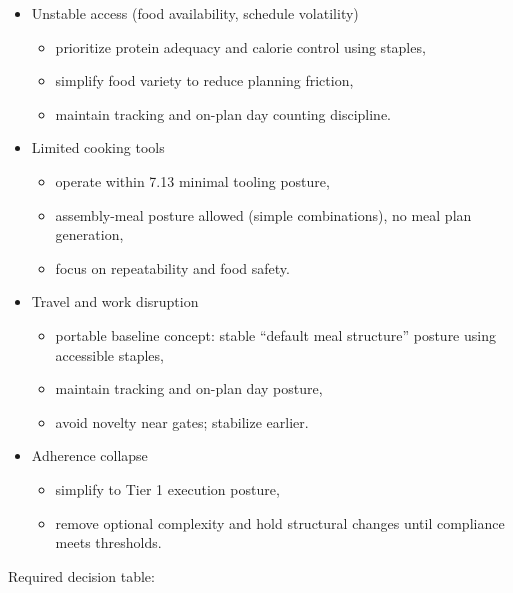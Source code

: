 \documentclass[10pt]{article}
\begin{document}
\begin{itemize}
\item Unstable access (food availability, schedule volatility)
\begin{itemize}
\item prioritize protein adequacy and calorie control using staples,
\item simplify food variety to reduce planning friction,
\item maintain tracking and on-plan day counting discipline.
\end{itemize}
\item Limited cooking tools
\begin{itemize}
\item operate within 7.13 minimal tooling posture,
\item assembly-meal posture allowed (simple combinations), no meal plan generation,
\item focus on repeatability and food safety.
\end{itemize}
\item Travel and work disruption
\begin{itemize}
\item portable baseline concept: stable “default meal structure” posture using accessible staples,
\item maintain tracking and on-plan day posture,
\item avoid novelty near gates; stabilize earlier.
\end{itemize}
\item Adherence collapse
\begin{itemize}
\item simplify to Tier 1 execution posture,
\item remove optional complexity and hold structural changes until compliance meets thresholds.
\end{itemize}
\end{itemize}

Required decision table:

\begingroup
\scriptsize
\setlength{\tabcolsep}{2pt}
\renewcommand{\arraystretch}{1.12}
\end{document}
